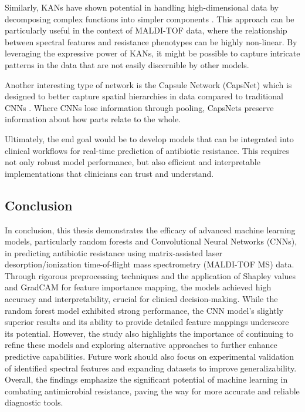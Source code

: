 \documentclass[english,11pt,a4paper,titlepage]{article}
\begin{document}
Similarly, KANs have shown potential in handling high-dimensional data by decomposing complex functions into simpler components \cite{liuKANKolmogorovArnoldNetworks2024}. This approach can be particularly useful in the context of MALDI-TOF data, where the relationship between spectral features and resistance phenotypes can be highly non-linear. By leveraging the expressive power of KANs, it might be possible to capture intricate patterns in the data that are not easily discernible by other models.

Another interesting type of network is the Capsule Network (CapsNet) which is designed to better capture spatial hierarchies in data compared to traditional CNNs \cite{sabourDynamicRoutingCapsules2017}. Where CNNs lose information through pooling, CapsNets preserve information about how parts relate to the whole.

Ultimately, the end goal would be to develop models that can be integrated into clinical workflows for real-time prediction of antibiotic resistance. This requires not only robust model performance, but also efficient and interpretable implementations that clinicians can trust and understand.

\subsection*{Conclusion}
In conclusion, this thesis demonstrates the efficacy of advanced machine learning models, particularly random forests and Convolutional Neural Networks (CNNs), in predicting antibiotic resistance using matrix-assisted laser desorption/ionization time-of-flight mass spectrometry (MALDI-TOF MS) data. Through rigorous preprocessing techniques and the application of Shapley values and GradCAM for feature importance mapping, the models achieved high accuracy and interpretability, crucial for clinical decision-making. While the random forest model exhibited strong performance, the CNN model's slightly superior results and its ability to provide detailed feature mappings underscore its potential. However, the study also highlights the importance of continuing to refine these models and exploring alternative approaches to further enhance predictive capabilities. Future work should also focus on experimental validation of identified spectral features and expanding datasets to improve generalizability. Overall, the findings emphasize the significant potential of machine learning in combating antimicrobial resistance, paving the way for more accurate and reliable diagnostic tools.
\end{document}
